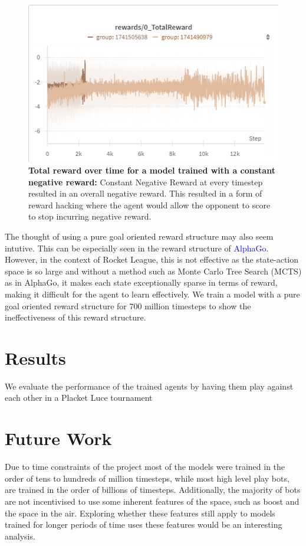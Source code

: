 \documentclass[conference]{IEEEtran}
\begin{document}
\begin{figure}
    \centering
    \includegraphics[width=\linewidth]{images/Phase0-TotalReward.png}
    \caption{\textbf{Total reward over time for a model trained with a constant negative reward:} Constant Negative Reward at every timestep resulted in an overall negative reward. This resulted in a form of reward hacking where the agent would allow the opponent to score to stop incurring negative reward.}
    \label{fig:phase0-totalreward}
\end{figure}

The thought of using a pure goal oriented reward structure may also seem intutive. This can be especially seen in the reward structure of \textcolor{blue}{AlphaGo}. However, in the context of Rocket League, this is not effective as the state-action space is so large and without a method such as Monte Carlo Tree Search (MCTS) as in AlphaGo, it makes each state exceptionally sparse in terms of reward, making it difficult for the agent to learn effectively. We train a model with a pure goal oriented reward structure for 700 million timesteps to show the ineffectiveness of this reward structure. 



\section{Results}
We evaluate the performance of the trained agents by having them play against each other in a Placket Luce tournament



\section{Future Work}
Due to time constraints of the project most of the models were trained in the order of tens to hundreds of million timesteps, while most high level play bots, are trained in the order of billions of timesteps. Additionally, the majority of bots are not incentivised to use some inherent features of the space, such as boost and the space in the air. Exploring whether these features still apply to models trained for longer periods of time uses these features would be an interesting analysis. 
\end{document}
